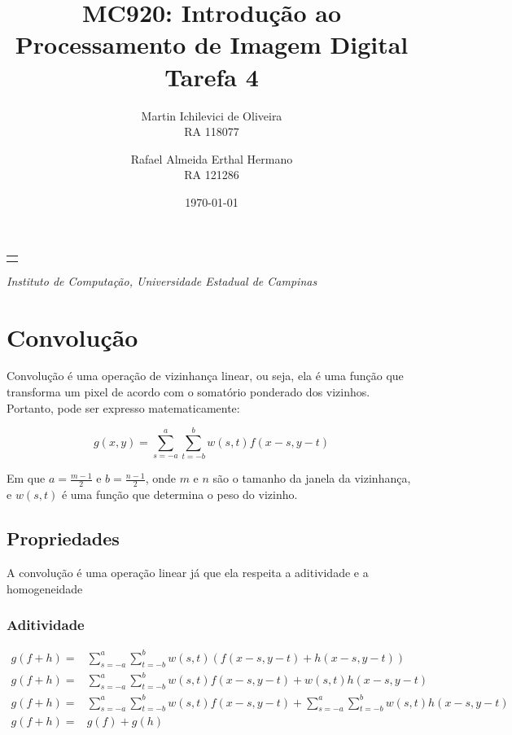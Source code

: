 \documentclass[10pt,a4paper]{article}
\makeatletter
\let\@institution\empty
\def\institution#1{\def\@institution{#1}}
\renewcommand{\maketitle}{
    \begin{center}
        {\Large\bfseries\@title\par\medskip}
        {\large
            \begin{tabular}[t]{c}%
                \@author
        \end{tabular}\par\medskip}
        {\itshape\@institution\par}
        {\itshape\@date\par}
\end{center}}
\makeatother
\begin{document}

\title{MC920: Introdução ao Processamento de Imagem Digital\\Tarefa 4}
\author{
    \begin{minipage}{6cm}
        \centering
        Martin Ichilevici de Oliveira\\
        RA 118077
    \end{minipage}
    \and
    \begin{minipage}{6cm}
        \centering
        Rafael Almeida Erthal Hermano\\
        RA 121286
    \end{minipage}
}
\institution{Instituto de Computação, Universidade Estadual de Campinas}
\date{\today}

\maketitle


\section{Convolução}
Convolução é uma operação de vizinhança linear, ou seja, ela é uma função que transforma um pixel de acordo com o somatório ponderado dos vizinhos.
Portanto, pode ser expresso matematicamente:

\begin{equation}
    g(x,y) = \sum_{s = -a}^{a}\sum_{t = -b}^{b}w(s,t) f(x - s, y - t)
    \label{eq:conv_eq}
\end{equation}

Em que $a = \frac{m-1}{2}$ e $b = \frac{n-1}{2}$, onde $m$ e $n$ são o tamanho da janela da vizinhança, e $w(s,t)$ é uma função que determina o peso do vizinho.

\subsection{Propriedades}
A convolução é uma operação linear já que ela respeita a aditividade e a homogeneidade

\subsubsection{Aditividade}
\begin{center}
    $\begin{aligned}
        g(f+h) = &\sum_{s = -a}^{a}\sum_{t = -b}^{b}w(s,t) (f(x - s, y - t) + h(x - s, y - t)) \\
        g(f+h) = &\sum_{s = -a}^{a}\sum_{t = -b}^{b}w(s,t) f(x - s, y - t) + w(s,t) h(x - s, y - t)\\
        g(f+h) = &\sum_{s = -a}^{a}\sum_{t = -b}^{b}w(s,t) f(x - s, y - t) + \sum_{s = -a}^{a}\sum_{t = -b}^{b}w(s,t) h(x - s, y - t) \\
        g(f+h) = &g(f) + g(h)
    \end{aligned}$
\end{center}
\end{document}
